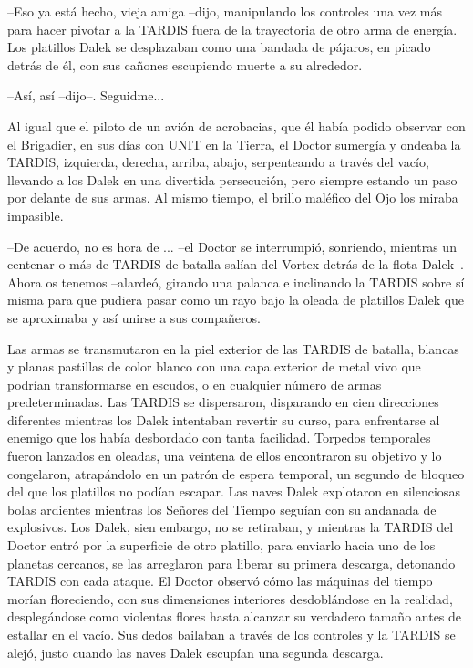 --Eso ya está hecho, vieja amiga --dijo, manipulando los controles una vez más para hacer pivotar a la TARDIS fuera de la trayectoria de otro arma de energía. Los platillos Dalek se desplazaban como una bandada de pájaros, en picado detrás de él, con sus cañones escupiendo muerte a su alrededor. 

--Así, así --dijo--. Seguidme...

Al igual que el piloto de un avión de acrobacias, que él había podido observar con el Brigadier, en sus días con UNIT en la Tierra, el Doctor sumergía y ondeaba la TARDIS, izquierda, derecha, arriba, abajo, serpenteando a través del vacío, llevando a los Dalek en una divertida persecución, pero siempre estando un paso por delante de sus armas.
Al mismo tiempo, el brillo maléfico del Ojo los miraba impasible.

--De acuerdo, no es hora de ... --el Doctor se interrumpió, sonriendo, mientras un centenar o más de TARDIS de batalla salían del Vortex detrás de la flota Dalek--. Ahora os tenemos --alardeó, girando una palanca e inclinando la TARDIS sobre sí misma para que pudiera pasar como un rayo bajo la oleada de platillos Dalek que se aproximaba y así unirse a sus compañeros.

Las armas se transmutaron en la piel exterior de las TARDIS de batalla, blancas y planas pastillas de color blanco con una capa exterior de metal vivo que podrían transformarse en escudos, o en cualquier número de armas predeterminadas. Las TARDIS se dispersaron, disparando en cien direcciones diferentes mientras los Dalek intentaban revertir su curso, para enfrentarse al enemigo que los había desbordado con tanta facilidad.
Torpedos temporales fueron lanzados en oleadas, una veintena de ellos encontraron su objetivo y lo congelaron, atrapándolo en un patrón de espera temporal, un segundo de bloqueo del que los platillos no podían escapar. Las naves Dalek explotaron en silenciosas bolas ardientes mientras los Señores del Tiempo seguían con su andanada de explosivos.
Los Dalek, sien embargo, no se retiraban, y mientras la TARDIS del Doctor entró por la superficie de otro platillo, para enviarlo hacia uno de los planetas cercanos, se las arreglaron para liberar su primera descarga, detonando TARDIS con cada ataque.
El Doctor observó cómo las máquinas del tiempo morían floreciendo, con sus dimensiones interiores desdoblándose en la realidad, desplegándose como violentas flores hasta alcanzar su verdadero tamaño antes de estallar en el vacío. Sus dedos bailaban a través de los controles y la TARDIS se alejó, justo cuando las naves Dalek escupían una segunda descarga.

